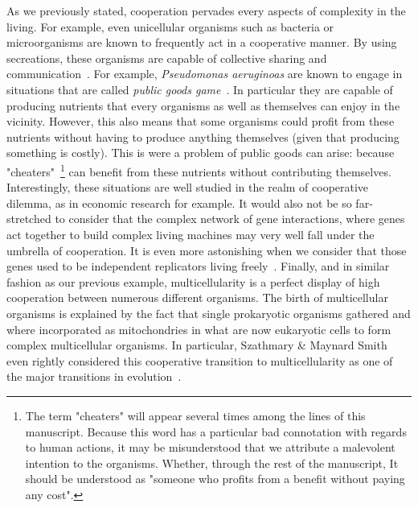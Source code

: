     As we previously stated, cooperation pervades every aspects of complexity in the living. For example, even unicellular organisms such as bacteria or microorganisms are known to frequently act in a cooperative manner. By using secreations, these organisms are capable of collective sharing and communication~\parencite{Elena2003, Keller2006, West2006}. For example, \emph{Pseudomonas aeruginoas} are known to engage in situations that are called \emph{public goods game}~\parencite{Popat2012, Harrison2013}. In particular they are capable of producing nutrients that every organisms as well as themselves can enjoy in the vicinity. However, this also means that some organisms could profit from these nutrients without having to produce anything themselves (given that producing something is costly). This is were a problem of public goods can arise: because "cheaters"~\footnote{The term "cheaters" will appear several times among the lines of this manuscript. Because this word has a particular bad connotation with regards to human actions, it may be misunderstood that we attribute a malevolent intention to the organisms. Whether, through the rest of the manuscript, It should be understood as "someone who profits from a benefit without paying any cost".} can benefit from these nutrients without contributing themselves. Interestingly, these situations are well studied in the realm of cooperative dilemma, as in economic research for example. It would also not be so far-stretched to consider that the complex network of gene interactions, where genes act together to build complex living machines may very well fall under the umbrella of cooperation. It is even more astonishing when we consider that those genes used to be independent replicators living freely~\parencite{Dawkins1976, Szathmary1995}. Finally, and in similar fashion as our previous example, multicellularity is a perfect display of high cooperation between numerous different organisms. The birth of multicellular organisms is explained by the fact that single prokaryotic organisms gathered and where incorporated as mitochondries in what are now eukaryotic cells to form complex multicellular organisms. In particular, Szathmary \& Maynard Smith even rightly considered this cooperative transition to multicellularity as one of the major transitions in evolution~\parencite{Szathmary1995}.

